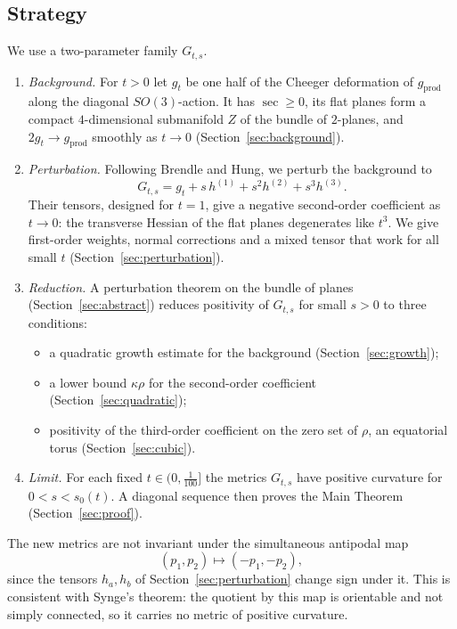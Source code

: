 \documentclass[11pt]{amsart}
\theoremstyle{definition}
\theoremstyle{remark}
\newcommand{\sect}{\operatorname{sec}}
\newcommand{\gprod}{g_{\mathrm{prod}}}
\begin{document}
\subsection*{Strategy}
We use a two-parameter family $G_{t,s}$.
\begin{enumerate}[label=(\arabic*),leftmargin=*]
\item \emph{Background.} For $t>0$ let $g_t$ be one half of the Cheeger deformation of $\gprod$ along the diagonal $SO(3)$-action. It has $\sect\ge0$, its flat planes form a compact $4$-dimensional submanifold $Z$ of the bundle of $2$-planes, and $2g_t\to\gprod$ smoothly as $t\to0$ (Section~\ref{sec:background}).
\item \emph{Perturbation.} Following Brendle and Hung, we perturb the background to
\[ G_{t,s}=g_t+s\,h^{(1)}+s^2h^{(2)}+s^3h^{(3)} . \]
Their tensors, designed for $t=1$, give a negative second-order coefficient as $t\to0$: the transverse Hessian of the flat planes degenerates like $t^3$. We give first-order weights, normal corrections and a mixed tensor that work for all small $t$ (Section~\ref{sec:perturbation}).
\item \emph{Reduction.} A perturbation theorem on the bundle of planes (Section~\ref{sec:abstract}) reduces positivity of $G_{t,s}$ for small $s>0$ to three conditions:
  \begin{itemize}[leftmargin=*]
  \item a quadratic growth estimate for the background (Section~\ref{sec:growth});
  \item a lower bound $\kappa\rho$ for the second-order coefficient (Section~\ref{sec:quadratic});
  \item positivity of the third-order coefficient on the zero set of $\rho$, an equatorial torus (Section~\ref{sec:cubic}).
  \end{itemize}
\item \emph{Limit.} For each fixed $t\in(0,\frac1{100}]$ the metrics $G_{t,s}$ have positive curvature for $0<s<s_0(t)$. A diagonal sequence then proves the Main Theorem (Section~\ref{sec:proof}).
\end{enumerate}

The new metrics are not invariant under the simultaneous antipodal map \[(p_1,p_2)\mapsto(-p_1,-p_2),\] since the tensors $h_a,h_b$ of Section~\ref{sec:perturbation} change sign under it. This is consistent with Synge's theorem: the quotient by this map is orientable and not simply connected, so it carries no metric of positive curvature.
\end{document}
